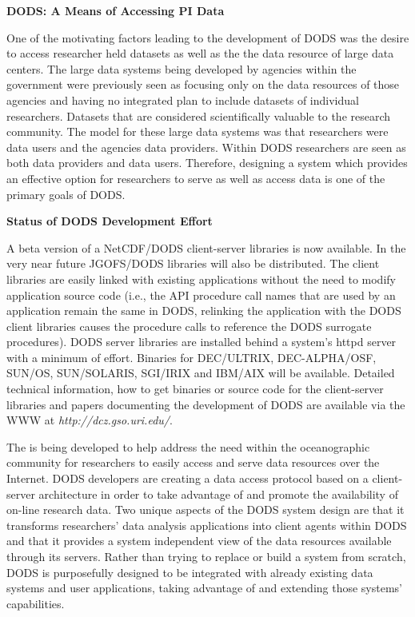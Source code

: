 
 
\large
\bigskip
\noindent
{\bf DODS: A Means of Accessing PI Data}
\medskip
\normalsize 

One of the motivating factors leading to the development of DODS was the
desire to access researcher held datasets as well as the the data resource of
large data centers.  The large data systems being developed by agencies
within the government were previously seen as focusing only on the data
resources of those agencies and having no integrated plan to include datasets
of individual researchers.  Datasets that are considered scientifically
valuable to the research community.  The model for these large data systems
was that researchers were data users and the agencies data providers.  Within
DODS researchers are seen as both data providers and data users.  Therefore,
designing a system which provides an effective option for researchers to
serve as well as access data is one of the primary goals of DODS.




\large
\bigskip
\noindent
{\bf Status of DODS Development Effort}
\medskip
\normalsize

A beta version of a NetCDF/DODS client-server libraries is now available.  In
the very near future JGOFS/DODS libraries will also be distributed.  The
client libraries are easily linked with existing applications without the
need to modify application source code (i.e., the API procedure call names
that are used by an application remain the same in DODS, relinking the
application with the DODS client libraries causes the procedure calls to
reference the DODS surrogate procedures).  DODS server libraries are
installed behind a system's httpd server with a minimum of effort.  Binaries
for DEC/ULTRIX, DEC-ALPHA/OSF, SUN/OS, SUN/SOLARIS, SGI/IRIX and IBM/AIX will
be available.  Detailed technical information, how to get binaries or source
code for the client-server libraries and papers documenting the development
of DODS are available via the WWW at {\em http://dcz.gso.uri.edu/}.


The \dods is being developed to help address the need within the
oceanographic community for researchers to easily access and serve data
resources over the Internet.  DODS developers are creating a data access
protocol based on a client-server architecture in order to take advantage of
and promote the availability of on-line research data.  Two unique aspects of
the DODS system design are that it transforms researchers' data analysis
applications into client agents within DODS and that it provides a system 
independent view of the data resources available through its servers.  Rather
than trying to replace or build a system from scratch, DODS is purposefully
designed to be integrated with already existing data systems and user
applications, taking advantage of and extending those systems' capabilities.


